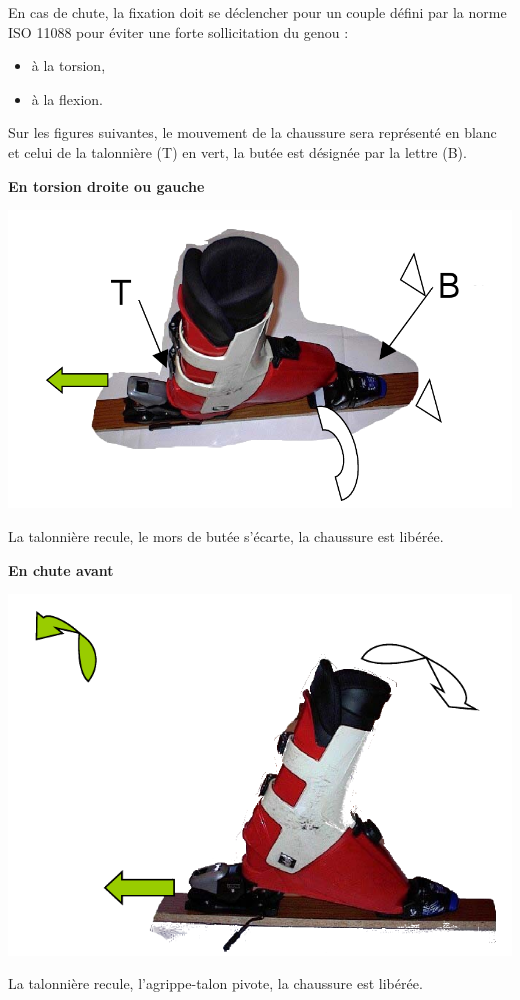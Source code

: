 En cas de chute, la fixation doit se déclencher pour un couple défini par la norme ISO 11088 pour éviter une forte sollicitation du genou :
\begin{itemize}
 \item à la torsion,
 \item à la flexion.
\end{itemize}

Sur les figures suivantes, le mouvement de la chaussure sera représenté en blanc et celui de la talonnière (T) en vert, la butée est désignée par la lettre (B).

\textbf{En torsion droite ou gauche}

\begin{minipage}{0.4\linewidth}
   \centering\includegraphics[width=0.9\linewidth]{img/torsion_droite.png}
 \end{minipage}
 \hfill
  \begin{minipage}{0.55\linewidth}
  La talonnière recule, le mors de butée s'écarte, la chaussure est libérée.
  \end{minipage}

\textbf{En chute avant}

\begin{minipage}{0.4\linewidth}
   \centering\includegraphics[width=0.9\linewidth]{img/Chute-avant.png}
 \end{minipage}
 \hfill
  \begin{minipage}{0.55\linewidth}
    La talonnière recule, l'agrippe-talon pivote, la chaussure est libérée.
  \end{minipage}

